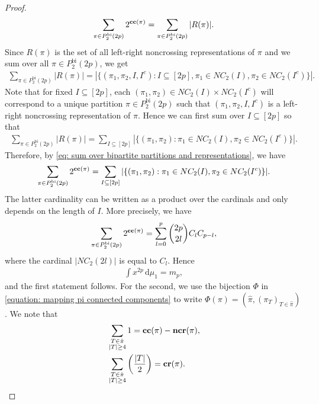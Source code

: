 \documentclass[12pt,reqno]{amsart}
\theoremstyle{plain}
\newcommand{\1}{\mathbf{1}}
\newcommand{\crblocks}{\operatorname{\bf cr}}
\newcommand{\ccblocks}{\operatorname{\bf cc}}
\newcommand{\ncrblocks}{\operatorname{\bf ncr}}
\begin{document}
\begin{proof}
\begin{align}
        \sum_{\pi \in P_2^{\operatorname{bi}}(2p)}2^{\ccblocks(\pi)}=\sum_{\pi \in P_2^{\operatorname{bi}}(2p)}|R(\pi)|.
    \end{align}
    Since $R(\pi)$ is the set of all left-right noncrossing representations of $\pi$ and we sum over all $\pi \in P_2^{\operatorname{bi}}(2p)$, we get
    \begin{align*}
        \sum_{\pi \in P_2^{\operatorname{bi}}(2p)}|R(\pi)|=|\{(\pi_1,\pi_2,I,I^c): I \subseteq[2p], \pi_1 \in NC_2(I),\pi_2 \in NC_2(I^c)\}|.
    \end{align*}
    Note that for fixed $I \subseteq [2p]$, each $(\pi_1,\pi_2) \in NC_2(I) \times NC_2(I^c)$ will correspond to a unique partition $\pi \in P_2^{\operatorname{bi}}(2p)$ such that $(\pi_1,\pi_2,I,I^c)$ is a left-right noncrossing representation of $\pi$. Hence we can first sum over $I\subseteq [2p]$ so that 
    \begin{align*}
        \sum_{\pi \in P_2^{\operatorname{bi}}(2p)}|R(\pi)|=\sum_{I \subseteq [2p]}|\{(\pi_1,\pi_2): \pi_1 \in NC_2(I), \pi_2 \in NC_2(I^c)\}|.
    \end{align*}
    Therefore, by \eqref{eq: sum over bipartite partitions and representations}, we have
    \begin{align*}
        \sum_{\pi \in P_2^{\operatorname{bi}}(2p)}2^{\ccblocks(\pi)}=\sum_{I \subseteq [2p]}|\{(\pi_1,\pi_2): \pi_1 \in NC_2(I), \pi_2 \in NC_2(I^c)\}|.
    \end{align*}
    The latter cardinality can be written as a product over the cardinals and only depends on the length of $I$. More precisely, we have
    \begin{align*}
        \sum_{\pi \in P_2^{\operatorname{bi}}(2p)}2^{\ccblocks(\pi)}=\sum_{l=0}^p \binom{2p}{2l}C_lC_{p-l},
    \end{align*}
    where the cardinal $|NC_2(2l)|$ is equal to $C_l$. Hence
    \begin{align*}
        \int x^{2p}\, \text{d}\mu_1=m_p,
    \end{align*}
    and the first statement follows. For the second, we use the bijection $\Phi$ in \eqref{equation: mapping pi connected components} to write $\Phi(\pi)=\left(\hat{\pi},(\pi_T)_{T \in \hat{\pi}}\right)$. We note that
    \begin{align*}
        &\sum_{\substack{T \in \hat{\pi}\\ |T| \ge 4}}1=\ccblocks(\pi)-\ncrblocks(\pi),\\
        &\sum_{\substack{T \in \hat{\pi}\\ |T| \ge 4}}\left(\frac{|T|}{2}\right)=\crblocks(\pi).

\end{align*}
\end{proof}
\end{document}
